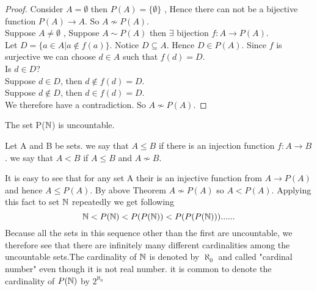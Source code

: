 \documentclass[a4paper,english,12pt]{article}   	%
\begin{document}
\begin{proof} Consider $A = \emptyset$ then $P(A) = \{ \emptyset \}$ , Hence there can not be a bijective function $P(A) \to A$. So $A \nsim P(A) $.\\
Suppose $A \neq \emptyset$ , Suppose $A \sim P(A)$ then $\exists$ bijection $f \colon A \to P(A)$.\\
Let $D=\{a \in A  | a \notin f(a)\}$. Notice $D \subseteq A$. Hence $D \in P(A)$. Since $f$ is surjective we can choose $d \in A$ such that $f(d)=D$.\\
Is $d \in D$?\\
Suppose $d \in D$, then $d \notin f(d)=D$.\\
Suppose $d \notin D$, then $d \in f(d)=D$.\\
We therefore have a contradiction. So $A \nsim P(A)$.
\end{proof}
\begin{cor} The set P($\mathbb{N}$) is uncountable.
\end{cor}
\begin{defn} Let A and B be sets. we say that $A \leq B$ if there is an injection function $f \colon A \to B$. we say that $A < B$ if $A \leq B$ and $A \nsim B$.
\end{defn}
It is easy to see that for any set A their is an injective function from $A \to P(A)$ and hence $A \leq P(A)$. By above Theorem $A \nsim P(A)$ so $A < P(A)$. Applying this fact to set $\mathbb{N}$ repeatedly we get following
\[ \mathbb{N} < P(\mathbb{N}) < P(P(\mathbb{N})) < P(P(P(\mathbb{N})))......\]
Because all the sets in this sequence other than the first are uncountable, we therefore see that there are infinitely many different cardinalities among the uncountable sets.The cardinality of $\mathbb{N}$ is denoted by $\aleph _{0}$ and called "cardinal number" even though it is not real number. it is common to denote the cardinality of $P(\mathbb{N})$ by  $ 2 ^{\aleph _{0}}$
\end{document}
